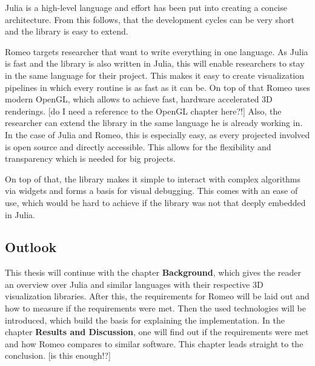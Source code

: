 Julia is a high-level language and effort has been put into creating a concise architecture. From this follows, that the development cycles can be very short and the library is easy to extend.

Romeo targets researcher that want to write everything in one language.
As Julia is fast and the library is also written in Julia, this will enable researchers to stay in the same language for their project. 
This makes it easy to create visualization pipelines in which every routine is as fast as it can be. 
On top of that Romeo uses modern OpenGL, which allows to achieve fast, hardware accelerated 3D renderings. [do I need a reference to the OpenGL chapter here?!]
Also, the researcher can extend the library in the same language he is already working in. 
In the case of Julia and Romeo, this is especially easy, as every projected involved is open source and directly accessible.
This allows for the flexibility and transparency which is needed for big projects.

On top of that, the library makes it simple to interact with complex algorithms via widgets and forms a basis for visual debugging. 
This comes with an ease of use, which would be hard to achieve if the library was not that deeply embedded in Julia.


\subsection{Outlook}
This thesis will continue with the chapter \textbf{Background}, which gives the reader an overview over Julia and similar languages with their respective 3D visualization libraries.
After this, the requirements for Romeo will be laid out and how to measure if the requirements were met.
Then the used technologies will be introduced, which build the basis for explaining the implementation.
In the chapter \textbf{Results and Discussion}, one will find out if the requirements were met and how Romeo compares to similar software.
This chapter leads straight to the conclusion.
[is this enough!?]